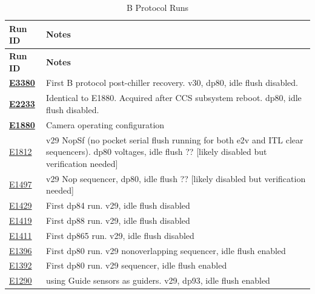 \begin{longtable}{|p{5.0cm}|p{8.5cm}|}
\caption{B Protocol Runs}\label{table:runs_BProtocol} \\
\hline
\textbf{Run ID} & \textbf{Notes} \\ \hline
\endfirsthead
\hline
\textbf{Run ID} & \textbf{Notes} \\ \hline
\endhead
\hline
\endfoot
\hline
\endlastfoot

\textbf{\href{https://s3df.slac.stanford.edu/data/rubin/lsstcam/E3380/w_2024_35/}{E3380}} & First B protocol post-chiller recovery. v30, dp80, idle flush disabled. \\ \hline
\textbf{\href{https://s3df.slac.stanford.edu/data/rubin/lsstcam/E2233/w_2024_35/}{E2233}} & Identical to E1880. Acquired after CCS subsystem reboot. dp80, idle flush disabled. \\ \hline
\textbf{\href{https://s3df.slac.stanford.edu/data/rubin/lsstcam/E1880/w_2024_35/}{E1880}} & Camera operating configuration \\ \hline
\href{https://s3df.slac.stanford.edu/data/rubin/lsstcam/E1812/w_2024_35/}{E1812} & v29 NopSf (no pocket serial flush running for both e2v and ITL clear sequencers). dp80 voltages, idle flush ?? [likely disabled but verification needed] \\ \hline
\href{https://s3df.slac.stanford.edu/data/rubin/lsstcam/E1497/w_2024_35/}{E1497} & v29 Nop sequencer, dp80, idle flush ?? [likely disabled but verification needed] \\ \hline
\href{https://s3df.slac.stanford.edu/data/rubin/lsstcam/E1429/w_2024_35/}{E1429} & First dp84 run. v29, idle flush disabled \\ \hline
\href{https://s3df.slac.stanford.edu/data/rubin/lsstcam/E1419/w_2024_35/}{E1419} & First dp88 run. v29, idle flush disabled \\ \hline
\href{https://s3df.slac.stanford.edu/data/rubin/lsstcam/E1411/w_2024_35/}{E1411} & First dp865 run. v29, idle flush disabled \\ \hline
\href{https://s3df.slac.stanford.edu/data/rubin/lsstcam/E1396/w_2024_35/}{E1396} & First dp80 run. v29 nonoverlapping sequencer, idle flush enabled \\ \hline
\href{https://s3df.slac.stanford.edu/data/rubin/lsstcam/E1392/w_2024_35/}{E1392} & First dp80 run. v29 sequencer, idle flush enabled \\ \hline
\href{https://s3df.slac.stanford.edu/data/rubin/lsstcam/E1290/w_2024_35/}{E1290} & using Guide sensors as guiders. v29, dp93, idle flush enabled \\ \hline

\end{longtable}

